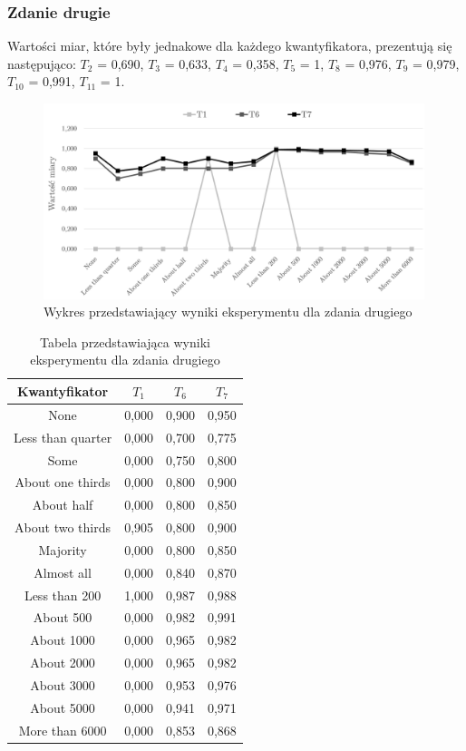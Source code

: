 \documentclass{classrep}
\begin{document}
\clearpage



\subsubsection{Zdanie drugie}

Wartości miar, które były jednakowe dla każdego kwantyfikatora, prezentują się następująco:
$T_2$ = 0,690, $T_3$ = 0,633, $T_4$ = 0,358, $T_5$ = 1, $T_8$ = 0,976, $T_9$ = 0,979, $T_{10}$ = 0,991, $T_{11}$ = 1.

\begin{figure}[H]
	\centering
	\includegraphics[width=0.99\textwidth]{Pictures/ResultCharts/Eks1_2.png}
	\caption{Wykres przedstawiający wyniki eksperymentu dla zdania drugiego}
\end{figure}

\begin{table}[H]
	\centering
	\begin{tabular}{c c c c} 
		\hline
		\textbf{Kwantyfikator}  & \textbf{$T_1$} & \textbf{$T_6$} & \textbf{$T_7$}\\ [0.5ex] 
		\hline
None	&	0,000	&	0,900	&	0,950	\\
Less than quarter	&	0,000	&	0,700	&	0,775	\\
Some 	&	0,000	&	0,750	&	0,800	\\
About one thirds 	&	0,000	&	0,800	&	0,900	\\
About half 	&	0,000	&	0,800	&	0,850	\\
About two thirds 	&	0,905	&	0,800	&	0,900	\\
Majority 	&	0,000	&	0,800	&	0,850	\\
Almost all	&	0,000	&	0,840	&	0,870	\\
Less than 200	&	1,000	&	0,987	&	0,988	\\
About 500	&	0,000	&	0,982	&	0,991	\\
About 1000	&	0,000	&	0,965	&	0,982	\\
About 2000	&	0,000	&	0,965	&	0,982	\\
About 3000	&	0,000	&	0,953	&	0,976	\\
About 5000	&	0,000	&	0,941	&	0,971	\\
More than 6000	&	0,000	&	0,853	&	0,868	\\
		\hline
	\end{tabular}
	\caption{Tabela przedstawiająca wyniki eksperymentu dla zdania drugiego}
\end{table}
\end{document}
